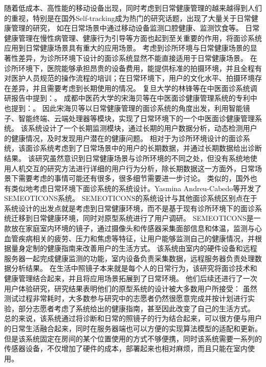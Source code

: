 随着低成本、高性能的移动设备出现，同时考虑到日常健康管理的越来越得到人们的重视，特别是在国外Self-tracking\cite{sanches2019hci}成为热门的研究话题，出现了大量关于日常健康管理的研究，
如在日常场景中通过移动设备监测口腔健康\cite{liang2020oralcam}、监测饮食\cite{burgermaster2019personal}等。
日常健康管理在慢性病管理、健康行为引导等方面也起到至关重要的作用，将面诊系统应用到日常健康场景具有重大的应用场景。
考虑到诊所环境与日常健康场景的显著性差异，为诊所环境下设计的面诊系统显然不能直接适用于日常健康场景。
在诊所环境下，医院能够承担昂贵的设备费用，能提供标准的拍摄环境，并且全程有对医护人员规范的操作流程的培训；在日常环境下，用户的文化水平、拍摄环境存在差异，并且需要考虑到长期使用的情况。
复旦大学的林锋等在中医面诊系统调研报告\cite{林锋2019中医面诊系统调研报告}中提到：。
成都中医药大学的宋海贝等在中医面诊健康管理系统的专利\cite{宋海贝2019中医面诊健康管理系统}中也提到：。
因此宋海贝等以日常健康管理的面诊系统的角度出发，利用智能镜子、智能终端、云端处理器等模块，实现了日常环境下的一个中医面诊健康管理系统。
该系统设计了一个长期监测模块，通过长期的用户数据分析，动态检测用户的健康情况，及时发现用户潜在的健康问题。
相对于为诊所环境设计的面诊系统，该面诊系统考虑到了日常场景中的用户的长期数据，并通过长期数据给出诊断结果。
该研究虽然意识到日常健康场景与诊所环境的不同之处，但没有系统地使用人机交互的研究方法进行详细的用户行为分析，除长期数据这一方面外，日常场景下需要考虑的事情可能还有很多，很多细节需要进一步讨论。
类似的，国外也有类似地考虑日常环境下面诊系统的系统设计。Yasmina Andreu-Cabedo等\cite{andreu2015mirror}开发了SEMEOTICONS系统。
SEMEOTICONS的系统设计与其他面诊系统区别点在于系统设计的出发点就是考虑到日常健康环境，而不是基于现有诊所环境下的面诊系统迁移到日常健康环境，同时对原型系统进行了用户调研。
SEMEOTICONS是一款放在家庭室内环境的镜子，通过摄像头和传感器采集面部信息和体温，监测与心血管疾病相关的疲劳、压力和焦虑等特征，让用户能够监测自己的健康情况，并根据量身定制的健康指南来改善用户的生活方式。
该系统由室内的硬件设备和远程服务器一起完成健康监测的功能，室内设备负责采集数据，远程服务器负责处理数据分析结果。
在生活中照镜子本来就是每个人的日常行为，该研究将面诊技术和健康管理结合起来，并且将应用场景拓展到了日常环境。
他们后续还进行了一次用户体验研究，研究结果表明\cite{coppini2017user}他们的原型系统的设计被大多数用户所接受： 虽然测试过程非常耗时，大多数参与研究中的志愿者仍然很愿意完成并按计划进行实验，部分志愿者考虑了系统给出的健康指南，甚至因此改变了自己的生活方式。
总的来说，该系统通过将诊断和日常的照镜子的行为结合起来，可以很方便与用户的日常生活融合起来，同时在服务器端也可以方便的实现算法模型的适配和更新。
但是该系统固定在房间的某个位置使用的方式不够便携，同时该系统需要一系列的传感器设备，不仅增加了硬件的成本，部署起来也相对麻烦，而且只能在室内使用。

